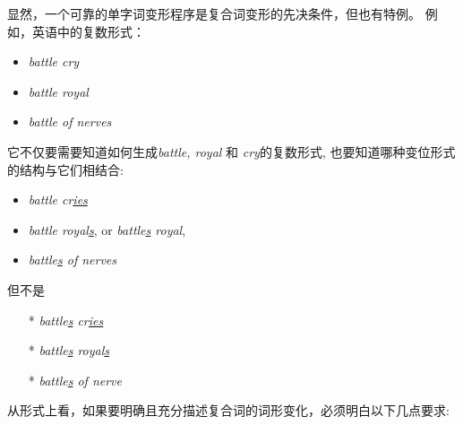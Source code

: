\bigskip
\noindent 显然，一个可靠的单字词变形程序是复合词变形的先决条件，但也有特例。
例如，英语中的复数形式：

\begin{itemize}
\item \emph{battle cry}
\item \emph{battle royal}
\item \emph{battle of nerves}
\end{itemize}

\noindent 它不仅要需要知道如何生成\emph{battle, royal} 和 \emph{cry}的复数形式, 也要知道哪种变位形式的结构与它们相结合:

\begin{itemize}
\item \emph{battle cr\underline{ies}}
\item \emph{battle royal\underline{s}}, or \emph{battle\underline{s} royal},
\item \emph{battle\underline{s} of nerves}
\end{itemize}

\noindent 但不是
 
\begin{itemize}
\item[*] {\emph{battle\underline{s} cr\underline{ies}}}
\item[*] {\emph{battle\underline{s} royal\underline{s}}}
\item[*] {\emph{battle\underline{s} of nerve\underline{ }}}
\end{itemize}

\bigskip
\noindent 从形式上看，如果要明确且充分描述复合词的词形变化，必须明白以下几点要求:

